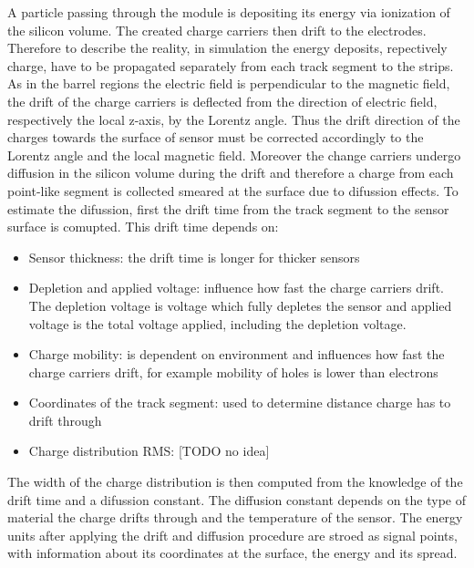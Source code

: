 A particle passing through the module is depositing its energy via ionization of the silicon volume. The created charge carriers then drift to the electrodes. Therefore to describe the reality, in simulation the energy deposits, repectively charge, have to be propagated separately from each track segment to the strips. As in the barrel regions the electric field is perpendicular to the magnetic field, the drift of the charge carriers is deflected from the direction of electric field, respectively the local z-axis, by the Lorentz angle. Thus the drift direction of the charges towards the surface of sensor must be corrected accordingly to the Lorentz angle and the local magnetic field. Moreover the change carriers undergo diffusion in the silicon volume during the drift and therefore a charge from each point-like segment is collected smeared at the surface due to difussion effects. To estimate the difussion, first the drift time from the track segment to the sensor surface is comupted. This drift time depends on:

\begin{itemize}
\item Sensor thickness: the drift time is longer for thicker sensors
\item Depletion and applied voltage: influence how fast the charge carriers drift. The depletion voltage is voltage which fully depletes the sensor and applied voltage is the total voltage applied, including the depletion voltage.
\item Charge mobility: is dependent on environment and influences how fast the charge carriers drift, for example mobility of holes is lower than electrons
\item Coordinates of the track segment: used to determine distance charge has to drift through
\item Charge distribution RMS: [TODO no idea] %
\end{itemize}

The width of the charge distribution is then computed from the knowledge of the drift time and a difussion constant. The diffusion constant depends on the type of material the charge drifts through and the temperature of the sensor. The energy units after applying the drift and diffusion procedure are stroed as signal points, with information about its coordinates at the surface, the energy and its spread.

